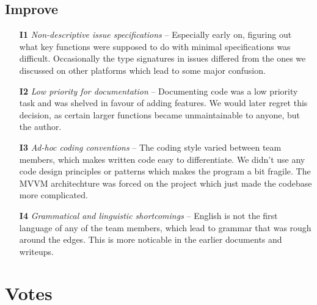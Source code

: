 \documentclass{article}
\begin{document}
\subsection*{Improve}
\begin{itemize}
  \item[\textbf{I1}] \textit{Non-descriptive issue specifications} -- Especially early on, figuring out what key functions were supposed to do with minimal specifications was difficult. Occasionally the type signatures in issues differed from the ones we discussed on other platforms which lead to some major confusion.
  \item[\textbf{I2}] \textit{Low priority for documentation} -- Documenting code was a low priority task and was shelved in favour of adding features. We would later regret this decision, as certain larger functions became unmaintainable to anyone, but the author.
  \item[\textbf{I3}] \textit{Ad-hoc coding conventions} -- The coding style varied between team members, which makes written code easy to differentiate. We didn't use any code design principles or patterns which makes the program a bit fragile. The MVVM architechture was forced on the project which just made the codebase more complicated.
  \item[\textbf{I4}] \textit{Grammatical and linguistic shortcomings} -- English is not the first language of any of the team members, which lead to grammar that was rough around the edges. This is more noticable in the earlier documents and writeups.
\end{itemize}

\newpage
\section*{Votes}
\end{document}

